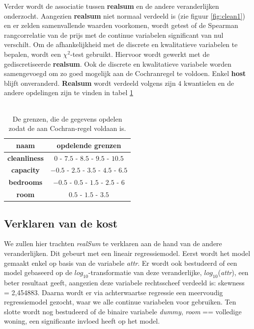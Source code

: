 \documentclass[a4paper]{kulakarticle}
\begin{document}
	Verder wordt de associatie tussen \textbf{realsum} en de andere veranderlijken onderzocht. Aangezien \textbf{realsum} niet normaal verdeeld is (zie figuur \ref{fig:clean1}) en er zelden samenvallende waarden voorkomen, wordt getest of de Spearman rangcorrelatie van de prijs met de continue variabelen significant van nul verschilt. Om de afhankelijkheid met de discrete en kwalitatieve variabelen te bepalen, wordt een $\chi ^2$-test gebruikt. Hiervoor wordt gewerkt met de gediscretiseerde \textbf{realsum}. Ook de discrete en kwalitatieve variabele worden samengevoegd om zo goed mogelijk aan de Cochranregel te voldoen. Enkel \textbf{host} blijft onveranderd. \textbf{Realsum} wordt verdeeld volgens zijn $4$ kwantielen en de andere opdelingen zijn te vinden in tabel \ref{grenzen}\\\\
	\begin{table}[h]
		\centering
			\begin{tabular}{c|c}
			\centering
			naam& opdelende grenzen\\
			\hline
			\textbf{cleanliness} & $ 0 $ - $ 7.5 $ - $ 8.5$ - $ 9.5 $ - $ 10.5$ \\
			\textbf{capacity}& $-0.5$ - $2.5$ - $3.5$ - $4.5$ - $6.5$\\
			\textbf{bedrooms}& $-0.5$ - $0.5$ - $1.5$ - $2.5$ - $6$\\
			\textbf{room} & $0.5$ - $1.5$ - $3.5$\\
			\end{tabular}
			\caption{De grenzen, die de gegevens opdelen zodat de aan Cochran-regel voldaan is.}
			\label{grenzen}
	\end{table}
	\subsection{Verklaren van de kost}
	
	We zullen hier trachten \textit{realSum} te verklaren aan de hand van de andere veranderlijken. Dit gebeurt met een lineair regressiemodel. Eerst wordt het model gemaakt enkel op basis van
	de variabele \textit{attr}. Er wordt ook bestudeerd of een model gebaseerd op de $log_{10}$-transformatie van deze veranderlijke, $log_{10}$(\textit{attr}), een beter resultaat geeft, aangezien deze variabele rechtsscheef verdeeld is: skewness = 2,454883.
	Daarna wordt er via achterwaartse regressie een meervoudig regressiemodel gezocht, waar we alle continue variabelen voor gebruiken. Ten slotte wordt nog bestudeerd of de binaire variabele \textit{dummy}, \textit{room} == volledige woning, een
	significante invloed heeft op het model.
	
\end{document}
